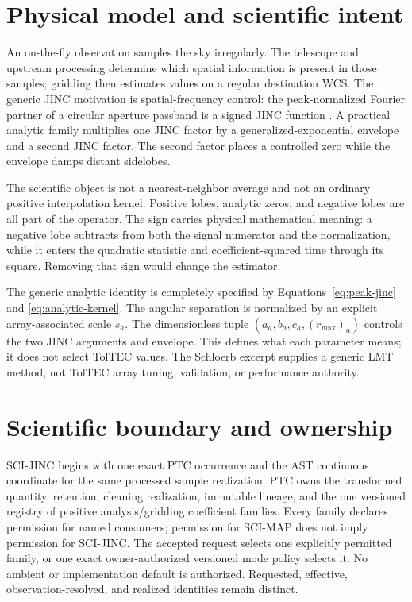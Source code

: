 \documentclass[11pt]{article}
\begin{document}
\section{Physical model and scientific intent}
\label{sec:physical-model}

An on-the-fly observation samples the sky irregularly.  The telescope and
upstream processing determine which spatial information is present in those
samples; gridding then estimates values on a regular destination WCS.  The
generic JINC motivation is spatial-frequency control: the peak-normalized
Fourier partner of a circular aperture passband is a signed JINC function
\cite{schloerb2019}.  A practical analytic family multiplies one JINC factor by
a generalized-exponential envelope and a second JINC factor.  The second
factor places a controlled zero while the envelope damps distant sidelobes.

The scientific object is not a nearest-neighbor average and not an ordinary
positive interpolation kernel.  Positive lobes, analytic zeros, and negative
lobes are all part of the operator.  The sign carries physical mathematical
meaning: a negative lobe subtracts from both the signal numerator and the
normalization, while it enters the quadratic statistic and coefficient-squared
time through its square.  Removing that sign would change the estimator.

The generic analytic identity is completely specified by
Equations~\eqref{eq:peak-jinc} and \eqref{eq:analytic-kernel}.  The angular
separation is normalized by an explicit array-associated scale $s_a$.  The
dimensionless tuple $(a_a,b_a,c_a,(r_{\max})_a)$ controls the two JINC
arguments and envelope.  This defines what each parameter means; it does not
select TolTEC values.  The Schloerb excerpt supplies a generic LMT method, not
TolTEC array tuning, validation, or performance authority.

\section{Scientific boundary and ownership}
\label{sec:ownership-narrative}

SCI-JINC begins with one exact PTC occurrence and the AST continuous
coordinate for the same processed sample realization.  PTC owns the
transformed quantity, retention, cleaning realization, immutable lineage, and
the one versioned registry of positive analysis/gridding coefficient families.
Every family declares permission for named consumers; permission for SCI-MAP
does not imply permission for SCI-JINC.  The accepted request selects one
explicitly permitted family, or one exact owner-authorized versioned mode
policy selects it.  No ambient or implementation default is authorized.
Requested, effective, observation-resolved, and realized identities remain
distinct.
\end{document}
